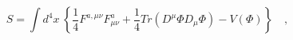 \begin{equation}
S = \int d^4 x\ \left\{\frac{1}{4}F^{a,\mu\nu}F^a_{\mu\nu} + \frac{1}{4}Tr(
D^\mu \Phi D_\mu
\Phi )  - V(\Phi)\right\}\quad,
\end{equation}

